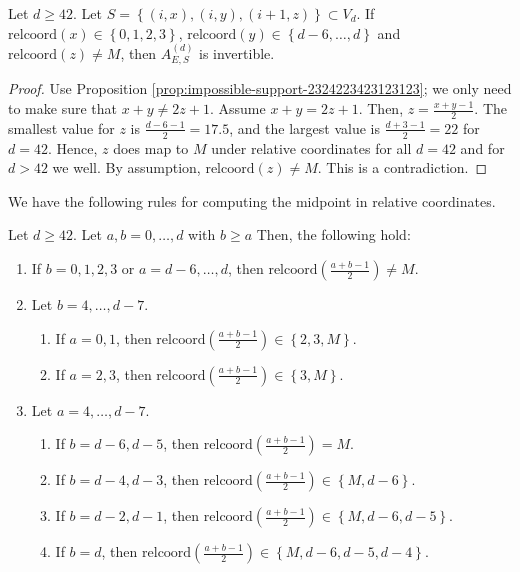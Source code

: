 \begin{corollary}
    Let \( d \geq 42 \).
    Let \( S = \left\{ (i,x), (i,y), (i+1,z) \right\} \subset V_d \). If \( \mathrm{relcoord}(x) \in \left\{ 0,1,2,3 \right\} \), \( \mathrm{relcoord}(y) \in \left\{ d-6, \dots, d \right\} \) and \( \mathrm{relcoord}(z) \neq M  \), then \( A^{(d)}_{E, S} \) is invertible.
\end{corollary}

\begin{proof}
    Use Proposition \ref{prop:impossible-support-2324223423123123}; we only need to make sure that \( x + y \neq 2z + 1 \). Assume \( x + y = 2z + 1 \). Then, \( z = \frac{x+y -1}{2} \). The smallest value for \( z \) is \( \frac{d-6-1}{2} = 17.5 \), and the largest value is \( \frac{d+3-1}{2} = 22 \) for \( d = 42 \). Hence, \( z \) does map to \( M \) under relative coordinates for all \( d = 42 \) and for \( d > 42 \) we well. By assumption,  \( \mathrm{relcoord}(z) \neq M  \). This is a contradiction.
\end{proof}

We have the following rules for computing the midpoint in relative coordinates.

\begin{proposition}
    Let \( d \geq 42 \). Let \( a,b  = 0, \dots, d \) with \( b \geq a \) Then, the following hold:
    \begin{enumerate}
        \item If \( b = 0, 1,2,3 \) or \( a = d-6, \dots, d \), then \( \mathrm{relcoord}( \frac{a + b - 1}{2}) \neq M \).
        \item Let \( b = 4, \dots, d-7 \).
        \begin{enumerate}
            \item If \( a = 0,1 \), then \( \mathrm{relcoord}( \frac{a + b - 1}{2}) \in \left\{ 2,3, M \right\} \).
            \item If \( a = 2,3 \), then \( \mathrm{relcoord}( \frac{a + b - 1}{2}) \in \left\{ 3, M \right\} \).
        \end{enumerate}
        \item Let \( a = 4, \dots, d-7 \).
        \begin{enumerate}
            \item If \( b = d-6, d-5 \), then \( \mathrm{relcoord}( \frac{a + b - 1}{2}) = M \).
            \item If \( b = d-4,d-3 \), then \( \mathrm{relcoord}( \frac{a + b - 1}{2}) \in \left\{ M, d-6 \right\} \).
            \item If \( b = d-2,d-1 \), then \( \mathrm{relcoord}( \frac{a + b - 1}{2}) \in \left\{ M, d-6,d-5 \right\} \).
            \item If \( b = d \), then \( \mathrm{relcoord}( \frac{a + b - 1}{2}) \in \left\{ M, d-6,d-5,d-4 \right\} \).
        \end{enumerate}
    \end{enumerate}
\end{proposition}

